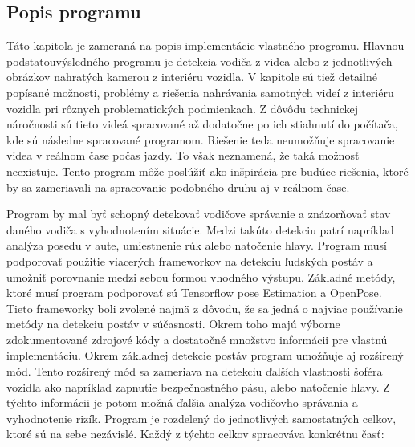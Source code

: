 \documentclass[slovak,master,dept460,male,cpp,cpdeclaration]{diploma}
\begin{document}
\subsection{Popis programu}
Táto kapitola je zameraná na  popis implementácie vlastného programu. Hlavnou podstatouvýsledného programu je detekcia vodiča z videa alebo z jednotlivých obrázkov nahratých kamerou z interiéru vozidla. V kapitole sú tiež detailné popísané možnosti, problémy a riešenia nahrávania samotných videí z interiéru vozidla pri rôznych problematických podmienkach. Z dôvôdu technickej náročnosti sú tieto videá spracované až dodatočne po ich stiahnutí do počítača, kde sú následne spracované  programom. Riešenie teda neumožňuje spracovanie videa v reálnom čase počas jazdy. To však neznamená, že taká možnosť neexistuje. Tento program môže poslúžiť ako inšpirácia pre budúce riešenia, ktoré by sa zameriavali na spracovanie podobného druhu aj v reálnom čase.\par
Program  by mal byť schopný detekovať vodičove správanie a znázorňovať stav daného vodiča s vyhodnotením situácie. Medzi takúto detekciu patrí napríklad analýza posedu v aute, umiestnenie rúk alebo natočenie hlavy. Program musí podporovať použitie viacerých frameworkov na detekciu ľudských postáv a umožniť porovnanie medzi sebou formou vhodného výstupu. Základné metódy, ktoré musí program podporovať sú Tensorflow pose Estimation a OpenPose. Tieto frameworky boli zvolené najmä z dôvodu, že sa jedná o najviac používanie metódy na detekciu postáv v súčasnosti. Okrem toho majú výborne zdokumentované zdrojové kódy a dostatočné množstvo informácii pre vlastnú implementáciu. Okrem základnej detekcie postáv program umožňuje aj rozšírený mód. Tento rozšírený mód sa zameriava na detekciu ďalších vlastnosti šoféra vozidla ako napríklad zapnutie bezpečnostného pásu, alebo natočenie hlavy. Z týchto informácii je potom možná ďalšia analýza vodičovho správania a vyhodnotenie rizík. Program je rozdelený do jednotlivých samostatných celkov, ktoré sú na sebe nezávislé. Každý z týchto celkov spracováva konkrétnu časť:
\end{document}
